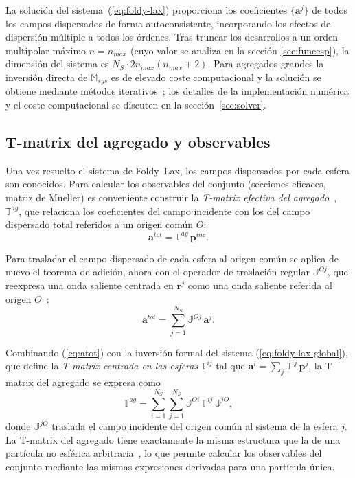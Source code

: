 La solución del sistema~(\ref{eq:foldy-lax}) proporciona los coeficientes
$\{\mathbf{a}^{j}\}$ de todos los campos dispersados de forma
autoconsistente, incorporando los efectos de dispersión múltiple a todos
los órdenes. Tras truncar los desarrollos a un orden multipolar máximo
$n = n_{max}$ (cuyo valor se analiza en la sección \ref{sec:funcesp}), la
dimensión del sistema es $N_S \cdot 2 n_{max}(n_{max}+2)$. Para agregados grandes
la inversión directa de $\mathbb{M}_{sys}$ es de elevado coste computacional
y la solución se obtiene mediante métodos
iterativos~\cite{Mackowski1996}; los detalles de la implementación
numérica y el coste computacional se discuten en la
sección~\ref{sec:solver}.
 
\subsection{T-matrix del agregado y observables}
 
Una vez resuelto el sistema de Foldy--Lax, los campos dispersados por
cada esfera son conocidos. Para calcular los observables del conjunto
(secciones eficaces, matriz de Mueller) es conveniente construir la
\textit{T-matrix efectiva del agregado}~\cite{Mackowski1994,Mackowski1996},
$\mathbb{T}^{ag}$, que relaciona los coeficientes del campo
incidente con los del campo dispersado total referidos a un origen
común $O$:
\begin{equation}
  \mathbf{a}^{tot} = \mathbb{T}^{ag}\,\mathbf{p}^{inc}.
\end{equation}
 
Para trasladar el campo dispersado de cada esfera al origen común se
aplica de nuevo el teorema de adición, ahora con el operador de
traslación regular $\mathbb{J}^{Oj}$, que reexpresa una onda saliente
centrada en $\mathbf{r}^j$ como una onda saliente referida al origen
$O$~\cite[ecs.~25--26]{Mackowski1991}:
\begin{equation}
\label{eq:atot}
  \mathbf{a}^{tot} = \sum_{j=1}^{N_S} \mathbb{J}^{Oj}\,\mathbf{a}^{j}.
\end{equation}
 
Combinando (\ref{eq:atot}) con la inversión formal del sistema
(\ref{eq:foldy-lax-global}), que define la \textit{T-matrix centrada en
las esferas} $\mathbb{T}^{ij}$ tal que
$\mathbf{a}^{i} = \sum_{j} \mathbb{T}^{ij}\,\mathbf{p}^{j}$, la
T-matrix del agregado se expresa como~\cite[ec.~5]{Mackowski1996}
\begin{equation}
\label{eq:Tcluster}
  \mathbb{T}^{ag}
  = \sum_{i=1}^{N_S}\sum_{j=1}^{N_S}
    \mathbb{J}^{Oi}\,\mathbb{T}^{ij}\,\mathbb{J}^{jO},
\end{equation}
donde $\mathbb{J}^{jO}$ traslada el campo incidente del origen común al
sistema de la esfera $j$. La T-matrix del agregado tiene exactamente la
misma estructura que la de una partícula no esférica
arbitraria~\cite{Mishchenko2002}, lo que permite calcular los
observables del conjunto mediante las mismas expresiones derivadas para
una partícula única.
 
